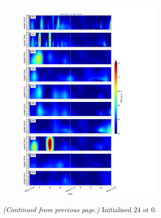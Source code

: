 \begin{figure}\ContinuedFloat
	\centering
			\begin{subfigure}[t]{\textwidth}
            \centering
            \includegraphics[trim={0cm 0cm 18.3cm 5.1cm},clip,width=0.8\textwidth]{./fig_09EM/20161224}
				\caption{}\label{fig:EM09_24}
			\end{subfigure}
    \caption{\textit{(Continued from previous page.)} Initialised \SI{24}{\dec} at \SI{0}{\UTC}. }        
\end{figure}
